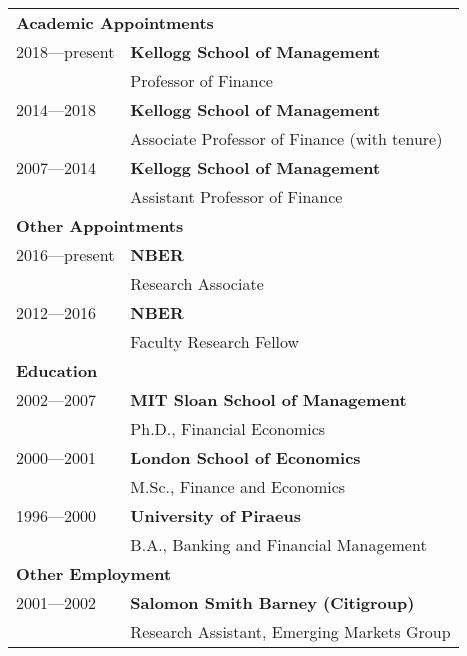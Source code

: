 \documentclass[12pt,letterpaper,serif,overlapped]{res}
\begin{document}
\begin{resume}
\begin{tabular}{ll}\\[1cm]
\multicolumn{2}{l}{\textbf{Academic Appointments}}\\
[0.5cm]
2018---present & \textbf{Kellogg School of Management}\\
& Professor of Finance\\
2014---2018 & \textbf{Kellogg School of Management}\\
& Associate Professor of Finance (with tenure)\\
 2007---2014 & \textbf{Kellogg School of Management}\\
& Assistant Professor of Finance\\
[0.5cm]
\multicolumn{2}{l}{\textbf{Other Appointments}}\\
[0.5cm]
2016---present & \textbf{NBER  }\\
& Research Associate\\[0.1cm]
2012---2016 & \textbf{NBER }\\
& Faculty Research Fellow\\
[0.5cm]
\multicolumn{2}{l}{\textbf{Education}}\\
[0.5cm]
2002---2007 & \textbf{MIT Sloan School of Management}\\
& Ph.D., Financial Economics\\[0.1cm]
2000---2001 & \textbf{London School of Economics}\\
& M.Sc., Finance and Economics \\[0.1cm]
1996---2000 & \textbf{University of Piraeus} \\
& B.A., Banking and Financial Management\\
[0.5cm]
\multicolumn{2}{l}{\textbf{Other Employment}}\\
[0.5cm]
2001---2002 & \textbf{Salomon Smith Barney (Citigroup)}\\
& Research Assistant, Emerging Markets Group\\
\end{tabular}







\newpage


\end{resume}
\end{document}

